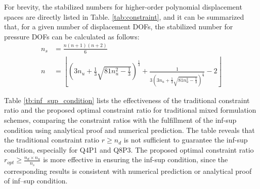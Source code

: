 For brevity, the stabilized numbers for higher-order polynomial displacement spaces are directly listed in Table. \ref{tab:constraint}, and it can be summarized that, for a given number of displacement DOFs, the stabilized number for pressure DOFs can be calculated as follows:
\begin{align}
n_s &= \frac{n(n + 1)(n + 2)}{6} \\
n &= \left\lfloor
\left( 3n_u + \frac{1}{3}\sqrt{81n_u^2 - \frac{1}{3}} \right)^{\frac{1}{3}}
+
\frac{1}{3\left( 3n_u + \frac{1}{3}\sqrt{81n_u^2 - \frac{1}{3}} \right)^{\frac{1}{3}}} - 2
\right\rfloor
\end{align}

Table \ref{tb:inf_sup_condition} lists the effectiveness of the traditional constraint ratio and the proposed optimal constraint ratio for traditional mixed formulation schemes, comparing the constraint ratios with the fulfillment of the inf-sup condition using analytical proof and numerical prediction. The table reveals that the traditional constraint ratio $r \ge n_d$ is not sufficient to guarantee the inf-sup condition, especially for Q4P1 and Q8P3. The proposed optimal constraint ratio $r_{opt} \ge \frac{n_d \times n_u}{n_s}$ is more effective in ensuring the inf-sup condition,
since the corresponding results is consistent with numerical prediction or analytical proof of inf--sup condition.

